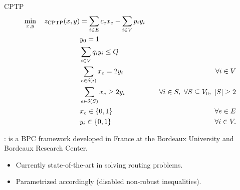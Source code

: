 \begin{frame}{CPTP}
	\begin{align}
		\min_{x,y} \quad z_\mt{CPTP}(x, y) & = \ExprCptpObjValDef                     & \label{eq:cptp-obj-function}                                                                          \\
		                                   & y_0 = 1                                  & \label{eq:cptp-depot-part-of-tour-constraint}                                                         \\
		                                   & \ExprCptpDemandSum  \le Q                & \label{eq:cptp-resource-upper-bound-constraint}                                                       \\
		                                   & \ExprCptpEdgesIncident{i}  = 2 y_i       & \quad \forall i \in V         \label{eq:cptp-flow-conservation-constraint}                            \\
		                                   & \ExprCptpFlowExiting{S} \ge 2 y_{i}      & \quad \forall i \in S,\ \forall S \subseteq V_0,\ \SetSize*{S} \ge 2 \label{eq:cptp-gsec-constraints} \\
		                                   & x_{e}                   \in \Set*{0, 1}  & \quad \forall e \in E               \label{eq:cptp-x-mip-var-bounds}                                  \\
		                                   & y_{i}                    \in \Set*{0, 1} & \quad \forall i \in V             \label{eq:cptp-y-mip-var-bounds}.
	\end{align}
\end{frame}

\begin{frame}{\bapcod{}}
	\bapcod{} \cite{sadykov2021}: is a BPC framework  developed in France at the Bordeaux University and Bordeaux Research Center.
	\begin{itemize}
		\item Currently state-of-the-art in solving routing problems.
		\item Parametrized accordingly (disabled non-robust inequalities).
	\end{itemize}
\end{frame}
